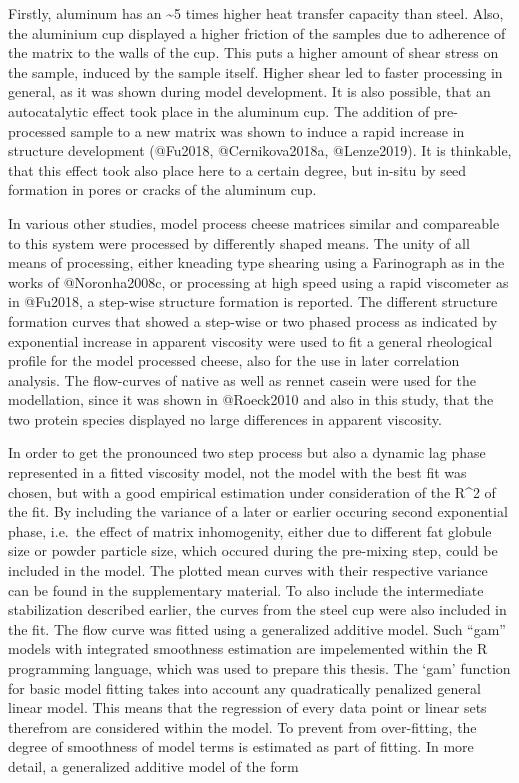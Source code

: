 \documentclass[
]{article}
\begin{document}
Firstly, aluminum has an \textasciitilde5 times higher heat transfer
capacity than steel. Also, the aluminium cup displayed a higher friction
of the samples due to adherence of the matrix to the walls of the cup.
This puts a higher amount of shear stress on the sample, induced by the
sample itself. Higher shear led to faster processing in general, as it
was shown during model development. It is also possible, that an
autocatalytic effect took place in the aluminum cup. The addition of
pre-processed sample to a new matrix was shown to induce a rapid
increase in structure development (@Fu2018, @Cernikova2018a,
@Lenze2019). It is thinkable, that this effect took also place here to a
certain degree, but in-situ by seed formation in pores or cracks of the
aluminum cup.

In various other studies, model process cheese matrices similar and
compareable to this system were processed by differently shaped means.
The unity of all means of processing, either kneading type shearing
using a Farinograph as in the works of @Noronha2008c, or processing at
high speed using a rapid viscometer as in @Fu2018, a step-wise structure
formation is reported. The different structure formation curves that
showed a step-wise or two phased process as indicated by exponential
increase in apparent viscosity were used to fit a general rheological
profile for the model processed cheese, also for the use in later
correlation analysis. The flow-curves of native as well as rennet casein
were used for the modellation, since it was shown in @Roeck2010 and also
in this study, that the two protein species displayed no large
differences in apparent viscosity.

In order to get the pronounced two step process but also a dynamic lag
phase represented in a fitted viscosity model, not the model with the
best fit was chosen, but with a good empirical estimation under
consideration of the R\^{}2 of the fit. By including the variance of a
later or earlier occuring second exponential phase, i.e.~the effect of
matrix inhomogenity, either due to different fat globule size or powder
particle size, which occured during the pre-mixing step, could be
included in the model. The plotted mean curves with their respective
variance can be found in the supplementary material. To also include the
intermediate stabilization described earlier, the curves from the steel
cup were also included in the fit. The flow curve was fitted using a
generalized additive model. Such ``gam'' models with integrated
smoothness estimation are impelemented within the R programming
language, which was used to prepare this thesis. The `gam' function for
basic model fitting takes into account any quadratically penalized
general linear model. This means that the regression of every data point
or linear sets therefrom are considered within the model. To prevent
from over-fitting, the degree of smoothness of model terms is estimated
as part of fitting. In more detail, a generalized additive model of the
form
\end{document}
